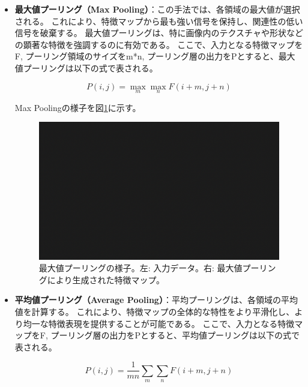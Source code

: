         \begin{itemize}
        \item \textbf{最大値プーリング（Max Pooling）}：この手法では、各領域の最大値が選択される。
        これにより、特徴マップから最も強い信号を保持し、関連性の低い信号を破棄する。
        最大値プーリングは、特に画像内のテクスチャや形状などの顕著な特徴を強調するのに有効である。
        ここで、入力となる特徴マップをF, プーリング領域のサイズをm*n, プーリング層の出力をPとすると、最大値プーリングは以下の式で表される。

        \begin{equation}
          P(i, j) = \max_{m}\max_{n}F(i+m, j+n)
        \end{equation}
        
        Max Poolingの様子を図\ref{fig:maxpooling}に示す。
        \begin{figure}[h]
          \centering
          \includegraphics[width=\textwidth]{figures/sample.png}
          \caption{最大値プーリングの様子。左: 入力データ。右: 最大値プーリングにより生成された特徴マップ。}
          \label{fig:maxpooling}
        \end{figure}

        \item \textbf{平均値プーリング（Average Pooling）}：平均プーリングは、各領域の平均値を計算する。
        これにより、特徴マップの全体的な特性をより平滑化し、より均一な特徴表現を提供することが可能である。
        ここで、入力となる特徴マップをF, プーリング層の出力をPとすると、平均値プーリングは以下の式で表される。

        \begin{equation}
          P(i, j) = \frac{1}{mn}\sum_{m}\sum_{n}F(i+m, j+n)
        \end{equation}
        
        \end{itemize}
      


